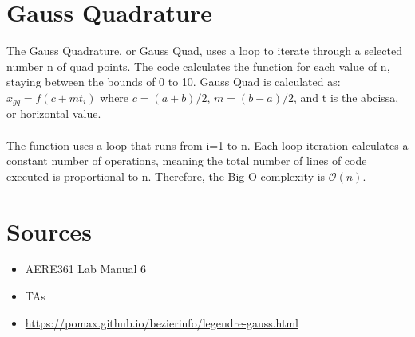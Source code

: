 \documentclass{article}
\begin{document}
\section{Gauss Quadrature}
The Gauss Quadrature, or Gauss Quad, uses a loop to iterate through a selected number n of quad points. The code calculates the function for each value of n, staying between the bounds of 0 to 10. Gauss Quad is calculated as: $x_{gq} = f(c + mt_i)$ where $c = (a + b)/2$, $m = (b - a)/2$, and t is the abcissa, or horizontal value.\\\\
The function uses a loop that runs from i=1 to n. Each loop iteration calculates a constant number of operations, meaning the total number of lines of code executed is proportional to n. Therefore, the Big O complexity is $\mathcal{O}(n)$.\\

\section{Sources}
\begin{itemize}
\item AERE361 Lab Manual 6
\item TAs
\item \url{https://pomax.github.io/bezierinfo/legendre-gauss.html}
\end{itemize}
\end{document}
